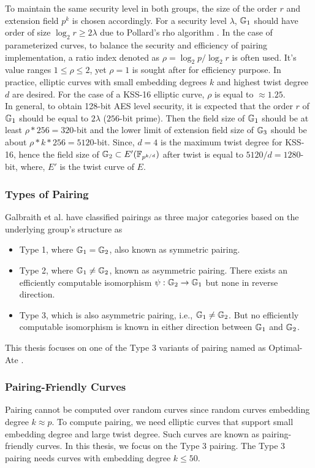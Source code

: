 To maintain the same security level in both groups, the size of the order $r$ and extension field $p^k$ is chosen accordingly. 
For a security level $\lambda$, ${\mathbb{G}}_{1}$ should have order of size $\log_2 r \geq 2\lambda$ due to Pollard's rho algorithm \cite{1978-pollard-kangaroo}.
In the case of parameterized curves, to balance the security and efficiency of pairing implementation, a ratio index denoted as $\rho = \log_2 p/ \log_2 r$ is often used.
It's value ranges $1\leq  \rho  \leq 2$, yet $\rho=1$ is sought after for efficiency purpose. 
In practice, elliptic curves with small embedding degrees $k$ and highest twist degree $d$ are desired.
For the case of a KSS-16 elliptic curve, $\rho$ is equal to  $ \approx 1.25$. \\
In general, to obtain 128-bit AES level security, it is expected that the order $r$ of ${\mathbb{G}}_{1}$ should be equal to $2\lambda $ ($256$-bit prime).
Then the field size of ${\mathbb{G}}_{1}$ should be at least $\rho*256 = 320$-bit and the lower limit of extension field size of ${\mathbb{G}}_{3}$ should be about $\rho*k*256= 5120$-bit.
Since,  $d=4$ is the maximum twist degree for KSS-16, hence the field size of ${\mathbb{G}}_{2} \subset E'(\mathbb{F}_{p^{k/d}})$ after twist is  equal to $5120/d=1280$-bit, where, $E'$ is the twist curve of $E$.


\subsubsection*{Types of Pairing}
Galbraith et al. \cite{galbraith2008pairings} have classified pairings as three major categories based on the underlying group's structure as 
\begin{itemize}
	\item Type 1, where ${\mathbb{G}}_{1} = {\mathbb{G}}_{2}$, also known as symmetric pairing. 
	\item Type 2, where ${\mathbb{G}}_{1} \neq {\mathbb{G}}_{2}$, known as asymmetric pairing. There exists an efficiently computable isomorphism $\psi : {\mathbb{G}}_{2} \to {\mathbb{G}}_{1}$ but none in reverse direction.
	\item Type 3, which is also asymmetric pairing, i.e., ${\mathbb{G}}_{1} \neq {\mathbb{G}}_{2}$. But no efficiently computable isomorphism is known in either direction  between ${\mathbb{G}}_{1}$ and ${\mathbb{G}}_{2}$.
\end{itemize}

This thesis focuses on one of the Type 3 variants of pairing named as Optimal-Ate \cite{DBLP:journals/tit/Vercauteren10}.


\subsubsection*{Pairing-Friendly Curves}
Pairing cannot be computed over random curves since random curves embedding degree $k \approx p$.
To compute pairing, we need elliptic curves that support small embedding degree and large twist degree. 
Such curves are known as pairing-friendly curves.
In this thesis, we focus on the Type 3 pairing.
The Type 3 pairing needs curves with embedding degree $k\leq50$.

